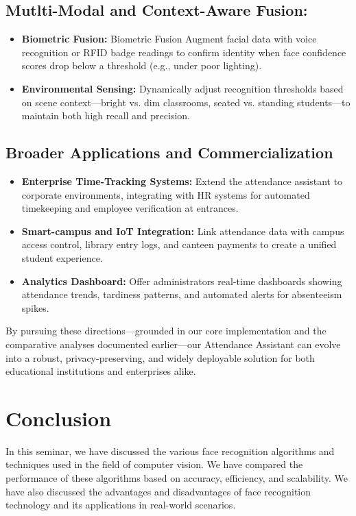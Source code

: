 \documentclass[openany]{report}
\begin{document}
\section{Mutlti-Modal and Context-Aware Fusion:}
\begin{itemize}
    \item \textbf{Biometric Fusion:} Biometric Fusion
    Augment facial data with voice recognition or RFID badge readings to confirm identity when face confidence scores drop below a threshold (e.g., under poor lighting).
    \item \textbf{Environmental Sensing:} Dynamically adjust recognition thresholds based on scene context—bright vs. dim classrooms, seated vs. standing students—to maintain both high recall and precision.
\end{itemize}

\section{Broader Applications and Commercialization}
\begin{itemize}
    \item \textbf{Enterprise Time-Tracking Systems:} Extend the attendance assistant to corporate environments, integrating with HR systems for automated timekeeping and employee verification at entrances.
    \item \textbf{Smart-campus and IoT Integration:} Link attendance data with campus access control, library entry logs, and canteen payments to create a unified student experience.
    \item \textbf{Analytics Dashboard:} Offer administrators real-time dashboards showing attendance trends, tardiness patterns, and automated alerts for absenteeism spikes.
\end{itemize}
By pursuing these directions—grounded in our core implementation and the comparative analyses documented earlier—our Attendance Assistant can evolve into a robust, privacy-preserving, and widely deployable solution for both educational institutions and enterprises alike.
\chapter{Conclusion}
In this seminar, we have discussed the various face recognition algorithms and techniques used in the field of computer vision. We have compared the performance of these algorithms based on accuracy, efficiency, and scalability. We have also discussed the advantages and disadvantages of face recognition technology and its applications in real-world scenarios.
\end{document}
